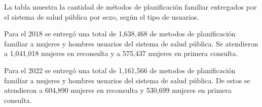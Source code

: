 La tabla muestra la cantidad de métodos de planificación familiar entregados por el sistema de salud pública por sexo, según el tipo de usuarios.

Para el 2018 se entregó una total de 1,638,468 de metodos de planificación familiar a mujeres y hombres usuarios del sistema de salud pública. Se atendieron a 1,041,018 mujeres en reconsulta y a 575,437 mujeres en primera consulta. 

Para el 2022 se entregó una total de 1,161,566 de metodos de planificación familiar a mujeres y hombres usuarios del sistema de salud pública. De estos se atendieron a 604,890 mujeres en reconsulta y 530,699 mujeres en primera consulta. 
